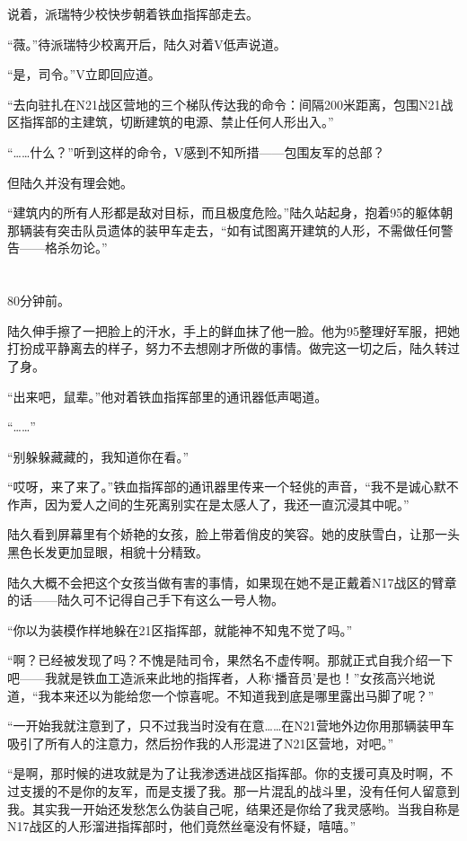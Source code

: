 说着，派瑞特少校快步朝着铁血指挥部走去。

“薇。”待派瑞特少校离开后，陆久对着V低声说道。

“是，司令。”V立即回应道。

“去向驻扎在N21战区营地的三个梯队传达我的命令：间隔200米距离，包围N21战区指挥部的主建筑，切断建筑的电源、禁止任何人形出入。”

“……什么？”听到这样的命令，V感到不知所措——包围友军的总部？

但陆久并没有理会她。

“建筑内的所有人形都是敌对目标，而且极度危险。”陆久站起身，抱着95的躯体朝那辆装有突击队员遗体的装甲车走去，“如有试图离开建筑的人形，不需做任何警告——格杀勿论。”

\section*{}

80分钟前。

陆久伸手擦了一把脸上的汗水，手上的鲜血抹了他一脸。他为95整理好军服，把她打扮成平静离去的样子，努力不去想刚才所做的事情。做完这一切之后，陆久转过了身。

“出来吧，鼠辈。”他对着铁血指挥部里的通讯器低声喝道。

“……”

“别躲躲藏藏的，我知道你在看。”

“哎呀，来了来了。”铁血指挥部的通讯器里传来一个轻佻的声音，“我不是诚心默不作声，因为爱人之间的生死离别实在是太感人了，我还一直沉浸其中呢。”

陆久看到屏幕里有个娇艳的女孩，脸上带着俏皮的笑容。她的皮肤雪白，让那一头黑色长发更加显眼，相貌十分精致。

陆久大概不会把这个女孩当做有害的事情，如果现在她不是正戴着N17战区的臂章的话——陆久可不记得自己手下有这么一号人物。

“你以为装模作样地躲在21区指挥部，就能神不知鬼不觉了吗。”

“啊？已经被发现了吗？不愧是陆司令，果然名不虚传啊。那就正式自我介绍一下吧——我就是铁血工造派来此地的指挥者，人称‘播音员’是也！”女孩高兴地说道，“我本来还以为能给您一个惊喜呢。不知道我到底是哪里露出马脚了呢？”

“一开始我就注意到了，只不过我当时没有在意……在N21营地外边你用那辆装甲车吸引了所有人的注意力，然后扮作我的人形混进了N21区营地，对吧。”

“是啊，那时候的进攻就是为了让我渗透进战区指挥部。你的支援可真及时啊，不过支援的不是你的友军，而是支援了我。那一片混乱的战斗里，没有任何人留意到我。其实我一开始还发愁怎么伪装自己呢，结果还是你给了我灵感哟。当我自称是N17战区的人形溜进指挥部时，他们竟然丝毫没有怀疑，嘻嘻。”

